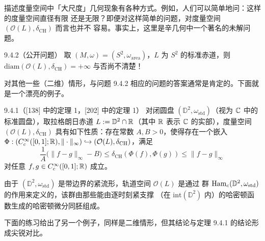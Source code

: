 描述度量空间中「大尺度」几何现象有各种方式。例如，人们可以简单地问：这样的度量空间直径有限
还是无限？即便对这样简单的问题，对度量空间 $(\mathcal{O}(L),\delta_{\mathrm{CH}})$ 而言也并不
容易。事实上，这里是辛几何中一个著名的未解问题。

\begin{wque}{9.4.2}（公开问题）
取 $(M,\omega)=(S^2,\omega_{\mathrm{area}})$，$L$ 为 $S^2$ 的标准赤道，则
$\mathrm{diam}(\mathcal{O}(L),\delta_{\mathrm{CH}})=+\infty$ 与否尚不清楚！
\end{wque}

对其他一些（二维）情形，与问题 9.4.2 相应的问题的答案通常是肯定的。下面就是一个漂亮的例子。

\begin{wthm}{9.4.1}（[138] 中的定理 1，[202] 中的定理 1）
对闭圆盘 $(\mathbb{D}^2,\omega_{\mathrm{std}})$（视为 $\mathbb{C}$ 中的标准圆盘），取拉格朗日赤道
$L:=\mathbb{D}^2\cap\mathbb{R}$（其中 $\mathbb{R}$ 表示 $\mathbb{C}$ 的实部），度量空间
$(\mathcal{O}(L),\delta_{\mathrm{CH}})$ 具有如下性质：存在常数 $A,B>0$，使得存在一个嵌入
$\Phi:(C_c^{\infty}([0,1];\mathbb{R}),\|\cdot\|_\infty)\hookrightarrow
(\mathcal{O}(L),\delta_{\mathrm{CH}})$，满足
\[
  \frac1A\big(\|f-g\|_\infty-B\big)
  \le\delta_{\mathrm{CH}}(\Phi(f),\Phi(g))
  \le\|f-g\|_\infty
\]
对任意 $f,g\in C_c^{\infty}([0,1];\mathbb{R})$ 成立。
\end{wthm}

由于 $(\mathbb{D}^2,\omega_{\mathrm{std}})$ 是带边界的紧流形，轨道空间 $\mathcal{O}(L)$ 是通过
群 $\operatorname{Ham}_c(\mathbb{D}^2,\omega_{\mathrm{std}})$ 的作用来定义的，该群由那些能由逐时刻紧支撑
（在 $\mathrm{int}(\mathbb{D}^2)$ 内）的哈密顿函数生成的哈密顿微分同胚组成。

下面的练习给出了另一个例子，同样是二维情形，但其结论与定理 9.4.1 的结论形成尖锐对比。

